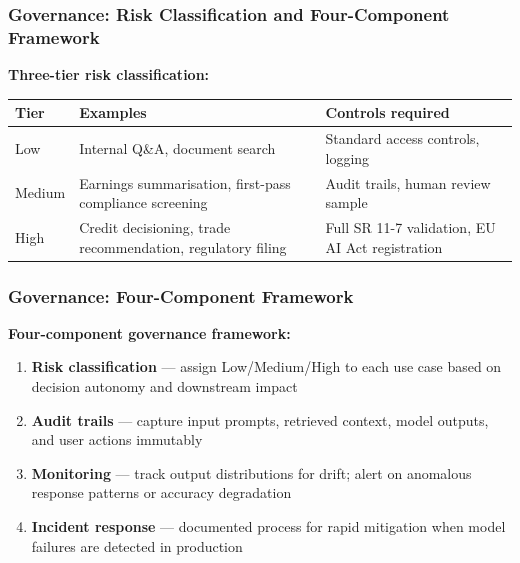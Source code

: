 \documentclass[9pt,t]{beamer}
\begin{document}
\begin{frame}
\frametitle{Governance: Risk Classification and Four-Component Framework}

\textbf{Three-tier risk classification:}

\begin{center}
\begin{tabular}{p{1.6cm}p{3.6cm}p{4.0cm}}
\toprule
\textbf{Tier} & \textbf{Examples} & \textbf{Controls required} \\
\midrule
Low & Internal Q\&A, document search & Standard access controls, logging \\
Medium & Earnings summarisation, first-pass compliance screening & Audit trails, human review sample \\
High & Credit decisioning, trade recommendation, regulatory filing & Full SR 11-7 validation, EU AI Act registration \\
\bottomrule
\end{tabular}
\end{center}
\end{frame}

\begin{frame}
\frametitle{Governance: Four-Component Framework}

\textbf{Four-component governance framework:}
\begin{enumerate}
  \item \textbf{Risk classification} --- assign Low/Medium/High to each use case
        based on decision autonomy and downstream impact
  \item \textbf{Audit trails} --- capture input prompts, retrieved context,
        model outputs, and user actions immutably
  \item \textbf{Monitoring} --- track output distributions for drift; alert on
        anomalous response patterns or accuracy degradation
  \item \textbf{Incident response} --- documented process for rapid mitigation
        when model failures are detected in production
\end{enumerate}
\end{frame}
\end{document}

